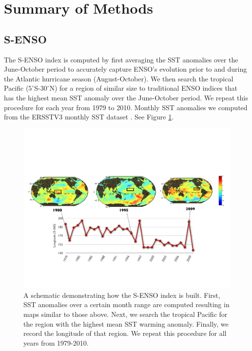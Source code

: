 \section{Summary of Methods}
\subsection{S-ENSO}
The S-ENSO index is computed by first averaging the SST anomalies over the June-October period to accurately capture ENSO's evolution prior to and during the Atlantic hurricane season (August-October). We then search the tropical Pacific ($5^\circ$S-$30^\circ$N) for a region of similar size to traditional ENSO indices that has the highest mean SST anomaly over the June-October period. We repeat this procedure for each year from 1979 to 2010. Monthly SST anomalies we computed from the ERSSTV3 monthly SST dataset \cite{reynolds2002}. See Figure \ref{fig:s_enso_graphic}.

\begin{figure}[htbp]
	\centering
		\includegraphics[width=5in]{figures/s_enso_graphic.pdf}
	\caption{A schematic demonstrating how the S-ENSO index is built. First, SST anomalies over a certain month range are computed resulting in maps similar to those above. Next, we search the tropical Pacific for the region with the highest mean SST warming anomaly. Finally, we record the longitude of that region. We repeat this procedure for all years from 1979-2010. }
	\label{fig:s_enso_graphic}
\end{figure}

